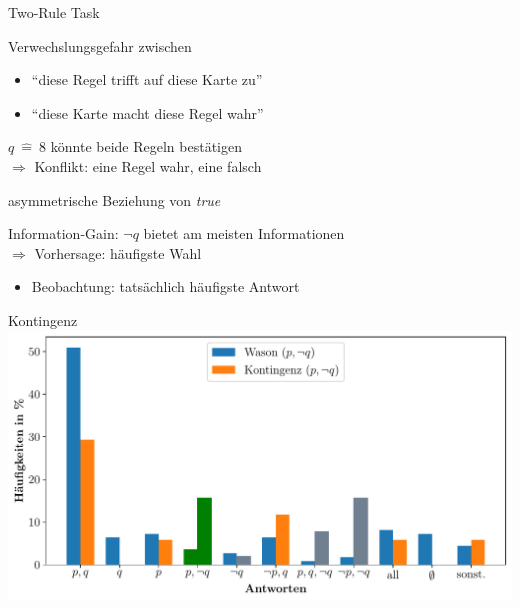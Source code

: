 \begin{frame}{Two-Rule Task {\scriptsize \cite[S.~102-104]{stenningHumanReasoningCognitive2008}}}

    \begin{itemize}
        {
            \color{gray}

            \item Verwechslungsgefahr zwischen
            \begin{itemize}
                \color{gray}

                \item \enquote{diese Regel trifft auf diese Karte zu}
                \item \enquote{diese Karte macht diese Regel wahr}
            \end{itemize}
            
            \item $q~\hat=~8$ könnte beide Regeln bestätigen \\
                $\Rightarrow$ Konflikt: eine Regel wahr, eine falsch
            
            \item asymmetrische Beziehung von \emph{true}
        }

        \item Information-Gain: $\lnot q$ bietet am meisten Informationen \\
            $\Rightarrow$ Vorhersage: häufigste Wahl
        \begin{itemize}
            \item Beobachtung: tatsächlich häufigste Antwort
        \end{itemize}
    \end{itemize}
\end{frame}


\begin{frame}{Kontingenz {\scriptsize \cite[S.~109]{stenningHumanReasoningCognitive2008}}}
    \includegraphics[width=\textwidth]{../plot/results_contingency.pdf}
\end{frame}


